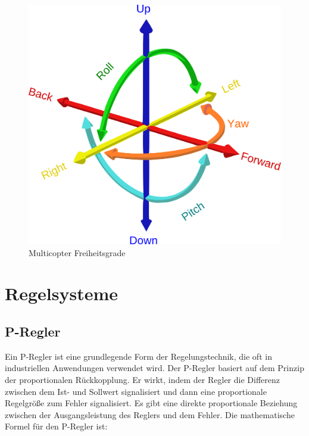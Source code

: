 \begin{figure}[H]
\begin{centering}
    \includegraphics[scale=0.2]{images/multicopter_freiheitsgrade.png}
    
    \caption{\label{fig:freiheitsgrade}Multicopter Freiheitsgrade \cite{imgfreiheitsgrade}}
\end{centering}
\end{figure}
    
\cite[vgl.][Kapitel 5]{SWB-165930377X}




\section{Regelsysteme} \label{regelsysteme:section}


    \subsection{P-Regler}
    \label{chp:p-regler}
    
    Ein \ac{P-Regler} ist eine grundlegende Form der Regelungstechnik, die oft in industriellen Anwendungen verwendet wird. Der \ac{P-Regler} basiert auf dem Prinzip der proportionalen Rückkopplung. Er wirkt, indem der Regler die Differenz zwischen dem Ist- und Sollwert signalisiert und dann eine proportionale Regelgröße zum Fehler signalisiert.
    Es gibt eine direkte proportionale Beziehung zwischen der Ausgangsleistung des Reglers und dem Fehler. Die mathematische Formel für den P-Regler ist: 

